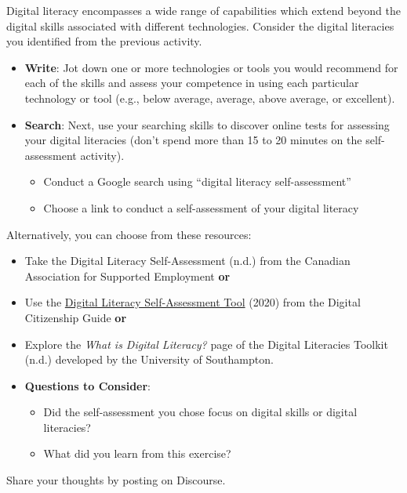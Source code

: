 \documentclass[
  letterpaper,
  DIV=11,
  numbers=noendperiod]{scrreprt}
\providecommand{\tightlist}{%
  \setlength{\itemsep}{0pt}\setlength{\parskip}{0pt}}\usepackage{longtable,booktabs,array}
\begin{document}
\begin{tcolorbox}[enhanced jigsaw, toprule=.15mm, colback=white, colframe=quarto-callout-note-color-frame, bottomtitle=1mm, leftrule=.75mm, coltitle=black, titlerule=0mm, rightrule=.15mm, colbacktitle=quarto-callout-note-color!10!white, left=2mm, title={Learning Activity}, opacitybacktitle=0.6, opacityback=0, breakable, toptitle=1mm, arc=.35mm, bottomrule=.15mm]

Digital literacy encompasses a wide range of capabilities which extend
beyond the digital skills associated with different technologies.
Consider the digital literacies you identified from the previous
activity.

\begin{itemize}
\tightlist
\item
  \textbf{Write}: Jot down one or more technologies or tools you would
  recommend for each of the skills and assess your competence in using
  each particular technology or tool (e.g., below average, average,
  above average, or excellent).
\item
  \textbf{Search}: Next, use your searching skills to discover online
  tests for assessing your digital literacies (don't spend more than 15
  to 20 minutes on the self-assessment activity).

  \begin{itemize}
  \tightlist
  \item
    Conduct a Google search using ``digital literacy self-assessment''
  \item
    Choose a link to conduct a self-assessment of your digital literacy
  \end{itemize}
\end{itemize}

Alternatively, you can choose from these resources:

\begin{itemize}
\item
  Take the Digital Literacy Self-Assessment (n.d.) from the Canadian
  Association for Supported Employment \textbf{or}
\item
  Use the
  \href{https://thinkspace.csu.edu.au/digitalcitizenshipguideetl523/}{Digital
  Literacy Self-Assessment Tool} (2020) from the Digital Citizenship
  Guide \textbf{or}
\item
  Explore the \emph{What is Digital Literacy?} page of the Digital
  Literacies Toolkit (n.d.) developed by the University of Southampton.
\item
  \textbf{Questions to Consider}:

  \begin{itemize}
  \tightlist
  \item
    Did the self-assessment you chose focus on digital skills or digital
    literacies?
  \item
    What did you learn from this exercise?
  \end{itemize}
\end{itemize}

Share your thoughts by posting on Discourse.

\end{tcolorbox}
\end{document}
